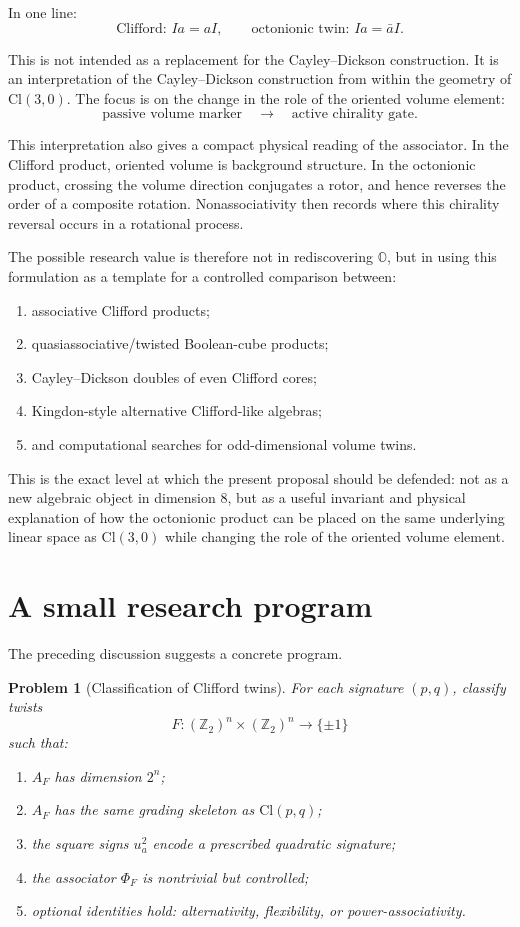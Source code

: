 \documentclass[11pt]{article}
\newtheorem{problem}{Problem}
\newcommand{\Ztwo}{\mathbb Z_2}
\newcommand{\Cl}{\mathrm{Cl}}
\newcommand{\assoc}{\Phi}
\begin{document}
In one line:
\[
\text{Clifford: } Ia=aI,
\qquad
\text{octonionic twin: } Ia=\bar a I.
\]

This is not intended as a replacement for the Cayley--Dickson construction. It
is an interpretation of the Cayley--Dickson construction from within the
geometry of $\Cl(3,0)$. The focus is on the change in the role of the oriented
volume element:
\[
\text{passive volume marker}
\quad\longrightarrow\quad
\text{active chirality gate}.
\]

This interpretation also gives a compact physical reading of the associator.
In the Clifford product, oriented volume is background structure. In the
octonionic product, crossing the volume direction conjugates a rotor, and hence
reverses the order of a composite rotation. Nonassociativity then records where
this chirality reversal occurs in a rotational process.

The possible research value is therefore not in rediscovering $\mathbb O$, but
in using this formulation as a template for a controlled comparison between:
\begin{enumerate}
    \item associative Clifford products;
    \item quasiassociative/twisted Boolean-cube products;
    \item Cayley--Dickson doubles of even Clifford cores;
    \item Kingdon-style alternative Clifford-like algebras;
    \item and computational searches for odd-dimensional volume twins.
\end{enumerate}

This is the exact level at which the present proposal should be defended: not
as a new algebraic object in dimension $8$, but as a useful invariant and
physical explanation of how the octonionic product can be placed on the same
underlying linear space as $\Cl(3,0)$ while changing the role of the oriented
volume element.

\section{A small research program}

The preceding discussion suggests a concrete program.

\begin{problem}[Classification of Clifford twins]
For each signature $(p,q)$, classify twists
\[
F:(\Ztwo)^n\times(\Ztwo)^n\to \{\pm 1\}
\]
such that:
\begin{enumerate}
    \item $A_F$ has dimension $2^n$;
    \item $A_F$ has the same grading skeleton as $\Cl(p,q)$;
    \item the square signs $u_a^2$ encode a prescribed quadratic signature;
    \item the associator $\assoc_F$ is nontrivial but controlled;
    \item optional identities hold: alternativity, flexibility, or power-associativity.
\end{enumerate}
\end{problem}
\end{document}
